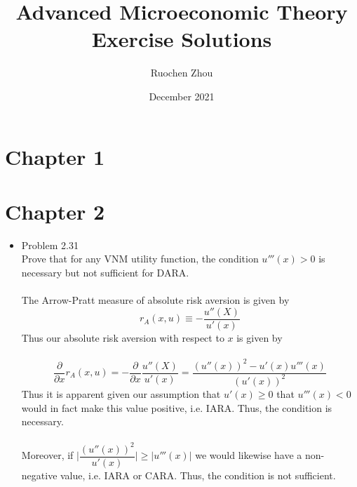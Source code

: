 \documentclass{article}
\title{Advanced Microeconomic Theory\\Exercise Solutions}
\author{Ruochen Zhou}
\date{December 2021}
\begin{document}
\maketitle

\section{Chapter 1}
\section{Chapter 2}
\begin{itemize}
    \item Problem 2.31\\
    Prove that for any VNM utility function, the condition $u'''(x)>0$ is necessary but not sufficient for DARA.\\\\
    The Arrow-Pratt measure of absolute risk aversion is given by\\
    $$r_A(x,u)\equiv-\dfrac{u''(X)}{u'(x)}$$
    Thus our absolute risk aversion with respect to $x$ is given by\\\\
    $$\dfrac{\partial}{\partial x}r_A(x,u)=-\dfrac{\partial}{\partial x}\dfrac{u''(X)}{u'(x)}=\dfrac{(u''(x))^2-u'(x)u'''(x)}{(u'(x))^2}$$
    Thus it is apparent given our assumption that $u'(x)\geq0$ that $u'''(x)<0$ would in fact make this value positive, i.e. IARA.  Thus, the condition is necessary.\\\\
    Moreover, if $\bigg|\dfrac{(u''(x))^2}{u'(x)}\bigg|\geq|u'''(x)|$ we would likewise have a non-negative value, i.e. IARA or CARA.  Thus, the condition is not sufficient.
\end{itemize}
\pagebreak
\end{document}
